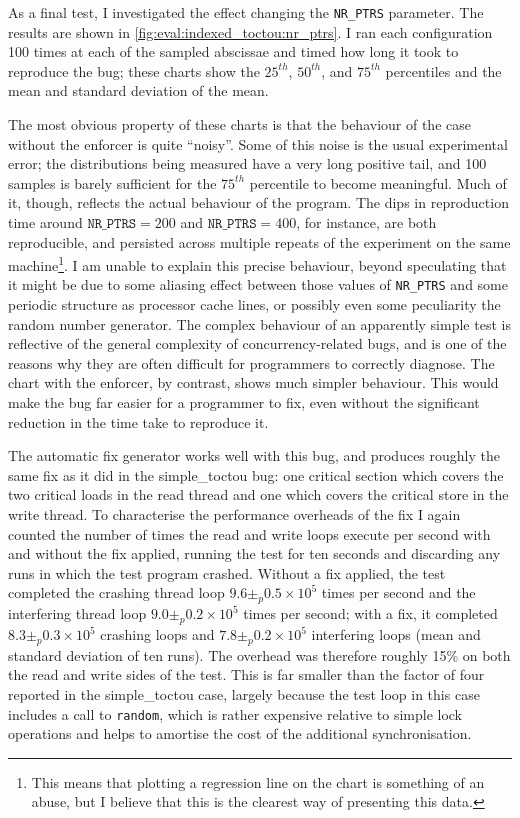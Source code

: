 As a final test, I investigated the effect changing the
\texttt{NR\_PTRS} parameter.  The results are shown in
\autoref{fig:eval:indexed_toctou:nr_ptrs}.  I ran each
configuration 100 times at each of the sampled abscissae and timed how
long it took to reproduce the bug; these charts show the $25^{th}$,
$50^{th}$, and $75^{th}$ percentiles and the mean and standard
deviation of the mean.

The most obvious property of these charts is that the behaviour of the
case without the enforcer is quite ``noisy''.  Some of this noise is
the usual experimental error; the distributions being measured have a
very long positive tail, and 100 samples is barely sufficient for the
$75^{th}$ percentile to become meaningful.  Much of it, though,
reflects the actual behaviour of the program.  The dips in
reproduction time around $\texttt{NR\_PTRS} = 200$ and
$\texttt{NR\_PTRS} = 400$, for instance, are both reproducible, and
persisted across multiple repeats of the experiment on the same
machine\footnote{This means that plotting a regression line on the
  chart is something of an abuse, but I believe that this is the
  clearest way of presenting this data.}.  I am unable to explain this
precise behaviour, beyond speculating that it might be due to some
aliasing effect between those values of \texttt{NR\_PTRS} and some
periodic structure as processor cache lines, or possibly even some
peculiarity the random number generator.  The complex behaviour of an
apparently simple test is reflective of the general complexity of
concurrency-related bugs, and is one of the reasons why they are often
difficult for programmers to correctly diagnose\needCite{}.  The chart
with the enforcer, by contrast, shows much simpler behaviour.  This
would make the bug far easier for a programmer to fix, even without
the significant reduction in the time take to reproduce it.

The automatic fix generator works well with this bug, and produces
roughly the same fix as it did in the simple\_toctou bug: one critical
section which covers the two critical loads in the read thread and one
which covers the critical store in the write thread.  To characterise
the performance overheads of the fix I again counted the number of
times the read and write loops execute per second with and without the
fix applied, running the test for ten seconds and discarding any runs
in which the test program crashed.  Without a fix applied, the test
completed the crashing thread loop $9.6 \pm_p 0.5 {\times} 10^5$ times
per second and the interfering thread loop $9.0 \pm_p 0.2 {\times}
10^5$ times per second; with a fix, it completed $8.3 \pm_p 0.3 \times
10^5$ crashing loops and $7.8 \pm_p 0.2 \times 10^5$ interfering loops
(mean and standard deviation of ten runs).  The overhead was therefore
roughly 15\% on both the read and write sides of the test.  This is
far smaller than the factor of four reported in the simple\_toctou
case, largely because the test loop in this case includes a call to
\verb|random|, which is rather expensive relative to simple lock
operations and helps to amortise the cost of the additional
synchronisation.


